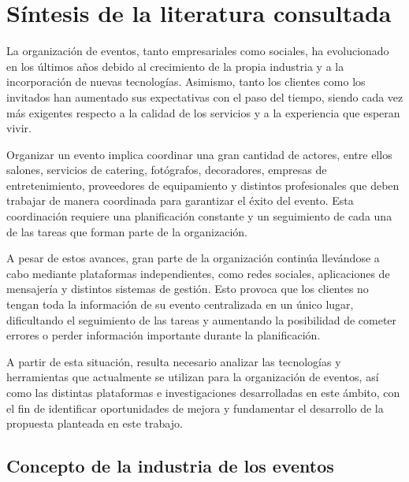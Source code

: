 
\chapter{Síntesis de la literatura consultada}\label{cap:marco-teorico}

La organización de eventos, tanto empresariales como sociales, ha
evolucionado en los últimos años debido al crecimiento de la propia
industria y a la incorporación de nuevas tecnologías. Asimismo, tanto los
clientes como los invitados han aumentado sus expectativas con el paso
del tiempo, siendo cada vez más exigentes respecto a la calidad de los
servicios y a la experiencia que esperan vivir.

Organizar un evento implica coordinar una gran cantidad de actores, entre
ellos salones, servicios de catering, fotógrafos, decoradores, empresas
de entretenimiento, proveedores de equipamiento y distintos profesionales
que deben trabajar de manera coordinada para garantizar el éxito del
evento. Esta coordinación requiere una planificación constante y un
seguimiento de cada una de las tareas que forman parte de la
organización.

A pesar de estos avances, gran parte de la organización continúa
llevándose a cabo mediante plataformas independientes, como redes
sociales, aplicaciones de mensajería y distintos sistemas de gestión.
Esto provoca que los clientes no tengan toda la información de su evento
centralizada en un único lugar, dificultando el seguimiento de las tareas
y aumentando la posibilidad de cometer errores o perder información
importante durante la planificación.

A partir de esta situación, resulta necesario analizar las tecnologías y
herramientas que actualmente se utilizan para la organización de eventos,
así como las distintas plataformas e investigaciones desarrolladas en
este ámbito, con el fin de identificar oportunidades de mejora y
fundamentar el desarrollo de la propuesta planteada en este trabajo.

\section{Concepto de la industria de los eventos}

